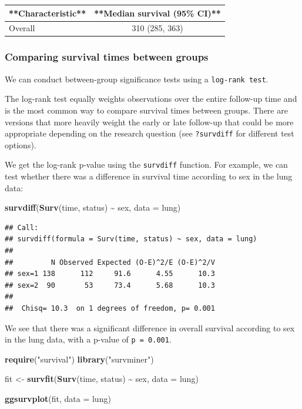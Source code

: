 \documentclass[
]{book}
\newenvironment{Shaded}{\begin{snugshade}}{\end{snugshade}}
\newcommand{\AttributeTok}[1]{\textcolor[rgb]{0.13,0.29,0.53}{#1}}
\newcommand{\FunctionTok}[1]{\textcolor[rgb]{0.13,0.29,0.53}{\textbf{#1}}}
\newcommand{\NormalTok}[1]{#1}
\newcommand{\OtherTok}[1]{\textcolor[rgb]{0.56,0.35,0.01}{#1}}
\newcommand{\SpecialCharTok}[1]{\textcolor[rgb]{0.81,0.36,0.00}{\textbf{#1}}}
\newcommand{\StringTok}[1]{\textcolor[rgb]{0.31,0.60,0.02}{#1}}
\begin{document}
\begin{tabular}{l|c}
\hline
**Characteristic** & **Median survival (95\% CI)**\\
\hline
Overall & 310 (285, 363)\\
\hline
\end{tabular}

\hypertarget{comparing-survival-times-between-groups}{%
\subsubsection{Comparing survival times between groups}\label{comparing-survival-times-between-groups}}

We can conduct between-group significance tests using a \texttt{log-rank\ test}.

The log-rank test equally weights observations over the entire follow-up time and is the most common way to compare survival times between groups. There are versions that more heavily weight the early or late follow-up that could be more appropriate depending on the research question (see \texttt{?survdiff} for different test options).

We get the log-rank p-value using the \texttt{survdiff} function. For example, we can test whether there was a difference in survival time according to sex in the lung data:

\begin{Shaded}
\begin{Highlighting}[]
\FunctionTok{survdiff}\NormalTok{(}\FunctionTok{Surv}\NormalTok{(time, status) }\SpecialCharTok{\textasciitilde{}}\NormalTok{ sex, }\AttributeTok{data =}\NormalTok{ lung)}
\end{Highlighting}
\end{Shaded}

\begin{verbatim}
## Call:
## survdiff(formula = Surv(time, status) ~ sex, data = lung)
## 
##         N Observed Expected (O-E)^2/E (O-E)^2/V
## sex=1 138      112     91.6      4.55      10.3
## sex=2  90       53     73.4      5.68      10.3
## 
##  Chisq= 10.3  on 1 degrees of freedom, p= 0.001
\end{verbatim}

We see that there was a significant difference in overall survival according to sex in the lung data, with a p-value of \texttt{p\ =\ 0.001}.

\begin{Shaded}
\begin{Highlighting}[]
\FunctionTok{require}\NormalTok{(}\StringTok{"survival"}\NormalTok{)}
\FunctionTok{library}\NormalTok{(}\StringTok{"survminer"}\NormalTok{)}

\NormalTok{fit }\OtherTok{\textless{}{-}} \FunctionTok{survfit}\NormalTok{(}\FunctionTok{Surv}\NormalTok{(time, status) }\SpecialCharTok{\textasciitilde{}}\NormalTok{ sex, }\AttributeTok{data =}\NormalTok{ lung)}

\FunctionTok{ggsurvplot}\NormalTok{(fit, }\AttributeTok{data =}\NormalTok{ lung)}
\end{Highlighting}
\end{Shaded}
\end{document}
